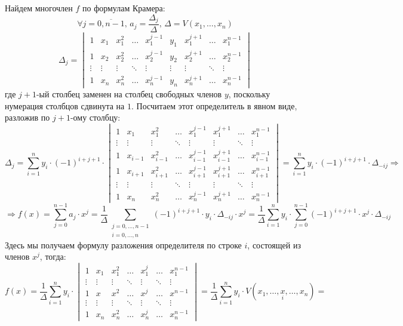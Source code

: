 \documentclass[12pt]{article}
\theoremstyle{definition}
\newcommand{\ddsum}[2]{\displaystyle\sum\limits_{#1}^{#2}}
\newcommand{\ovl}[1]{\overline{#1}}
\begin{document}
Найдем многочлен $f$ по формулам Крамера:
$$
	\forall j = \ovl{0,n-1}, \, a_j = \dfrac{\Delta_j}{\Delta}, \, \Delta = V(x_1,\dotsc, x_n) 
$$
$$
	\Delta_j = 
	\begin{vmatrix}
		1 & x_1 & x_1^2 & \dotsc & x_1^{j-1}& y_1 & x_1^{j+1} & \dotsc & x_1^{n-1}\\
		1 & x_2 & x_2^2 & \dotsc & x_2^{j-1}& y_2 & x_2^{j+1} & \dotsc &x_2^{n-1}\\
		\vdots & \vdots & \vdots & \ddots & \vdots 	& \vdots & \vdots & \ddots & \vdots \\
		1 & x_n & x_n^2 & \dotsc & x_n^{j-1}& y_n & x_n^{j+1} & \dotsc &x_n^{n-1}
	\end{vmatrix}
$$
где $j+1$-ый столбец заменен на столбец свободных членов $y$, поскольку нумерация столбцов сдвинута на $1$. Посчитаем этот определитель в явном виде, разложив по $j+1$-ому столбцу:
$$
	\Delta_j = \ddsum{i = 1}{n}y_i{\cdot}(-1)^{i + j + 1}{\cdot}
	\begin{vmatrix}
		1 & x_1 & x_1^2 & \dotsc & x_1^{j-1}&  x_1^{j+1} & \dotsc & x_1^{n-1}\\
		\vdots & \vdots & \vdots & \ddots &  \vdots & \vdots & \ddots & \vdots \\
		1 & x_{i-1} & x_{i-1}^2 & \dotsc & x_{i-1}^{j-1}&  x_{i-1}^{j+1} & \dotsc &x_{i-1}^{n-1}\\
		1 & x_{i+1} & x_{i+1}^2 & \dotsc & x_{i+1}^{j-1}&  x_{i+1}^{j+1} & \dotsc &x_{i+1}^{n-1}\\
		\vdots & \vdots & \vdots & \ddots &  \vdots & \vdots & \ddots & \vdots \\
		1 & x_n & x_n^2 & \dotsc & x_n^{j-1} & x_n^{j+1} & \dotsc &x_n^{n-1}
	\end{vmatrix} = \ddsum{i = 1}{n}y_i{\cdot}(-1)^{i + j + 1}{\cdot}\Delta_{-ij} \Rightarrow
$$
$$
	\Rightarrow f(x) = \ddsum{j = 0 }{n-1}a_j{\cdot}x^j = \dfrac{1}{\Delta}\ddsum{\substack{j = 0,\dotsc,n-1\\i = 0,\dotsc,n}}{}(-1)^{i + j + 1}{\cdot}y_i{\cdot}\Delta_{-ij} {\cdot}x^j =  \dfrac{1}{\Delta}\ddsum{i =1}{n}y_i{\cdot}\ddsum{j = 0}{n-1}(-1)^{i + j + 1}{\cdot}x^j{\cdot}\Delta_{-ij} 
$$
Здесь мы получаем формулу разложения определителя по строке $i$, состоящей из членов $x^j$, тогда:
$$
	f(x) = \dfrac{1}{\Delta}\ddsum{i =1}{n}y_i{\cdot}
	\begin{vmatrix}
		1 & x_1 & x_1^2 & \dotsc & x_1^j & \dotsc & x_1^{n-1}\\
		\vdots & \vdots & \vdots & \ddots  & \vdots & \ddots & \vdots \\
		1 & x 	& x^2 	& \dotsc & x^j & \dotsc &x^{n-1}\\
		\vdots & \vdots & \vdots & \ddots  & \vdots & \ddots & \vdots \\
		1 & x_n & x_n^2 & \dotsc & x_n^j & \dotsc &x_n^{n-1}
	\end{vmatrix} = \dfrac{1}{\Delta}\ddsum{i =1}{n}y_i{\cdot}V(x_1,\dotsc,\underset{i}{x}, \dotsc, x_n) =
$$
\end{document}
